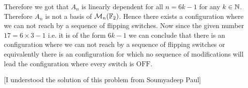 \documentclass[a4paper, 11pt]{article}
\begin{document}
{Therefore we got that $A_n$ is linearly dependent for all  $n=6k-1$ for any $k\in\mathbb{N}$. Therefore $A_n$ is not a basis of $\mathcal{M}_n(\mathbb{F}_2)$. Hence there exists a configuration where we can not reach by a sequence of flipping switches. Now since the given number $17=6\times 3-1$ i.e. it is of the form $6k-1$ we can conclude that there is an configuration where we can not reach by a sequence of flipping switches or equivalently there is an configuration for which no sequence of modifications will lead the configuration where every switch is $\mathrm{OFF}$.
}\parinf
\vspace*{5mm}

[I understood the solution of this problem from Soumyadeep Paul]
\pagebreak
\end{document}
